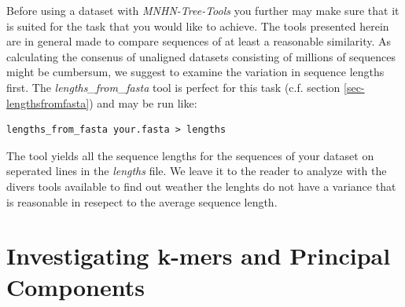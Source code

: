 Before using a dataset with \emph{MNHN-Tree-Tools} you further may make
sure that it is suited for the task that you would like to
achieve. The tools presented herein are in general made to
compare sequences of at least a reasonable similarity. As calculating
the consenus of unaligned datasets consisting of millions of
sequences might be cumbersum, we suggest to
examine the variation in sequence lengths first. The
\emph{lengths\_from\_fasta} tool is perfect for this task (c.f. section
\ref{sec-lengthsfromfasta}) and may be run like:
\begin{lstlisting}
lengths_from_fasta your.fasta > lengths
\end{lstlisting}
The tool yields all the sequence lengths for the sequences of your
dataset on seperated lines in the \emph{lengths} file. We leave it to
the reader to analyze with the divers tools available to find out weather
the lenghts do not have a variance that is reasonable in resepect to
the average sequence length. 

\section{Investigating k-mers and Principal Components}

